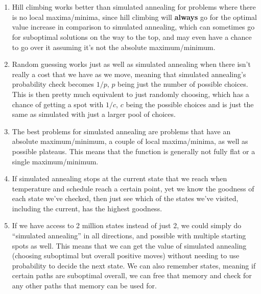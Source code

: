 \documentclass[12pt]{article}
\begin{document}
\section{}
\begin{enumerate}[label={\large\textbf{\alph*)}}]
\item Hill climbing works better than simulated annealing for problems where there is no local maxima/minima, since hill climbing will \textbf{always} go for the optimal value increase in comparison to simulated annealing, which can sometimes go for suboptimal solutions on the way to the top, and may even have a chance to go over it assuming it's not the absolute maximum/minimum.
\pagebreak
\item Random guessing works just as well as simulated annealing when there isn't really a cost that we have as we move, meaning that simulated annealing's probability check becomes $1/p$, $p$ being just the number of possible choices. This is then pretty much equivalent to just randomly choosing, which has a chance of getting a spot with $1/c$, $c$ being the possible choices and is just the same as simulated with just a larger pool of choices.
\item The best problems for simulated annealing are problems that have an absolute maximum/minimum, a couple of local maxima/minima, as well as possible plateaus. This means that the function is generally not fully flat or a single maximum/minimum.
\item If simulated annealing stops at the current state that we reach when temperature and schedule reach a certain point, yet we know the goodness of each state we've checked, then just see which of the states we've visited, including the current, has the highest goodness.
\item If we have access to 2 million states instead of just 2, we could simply do ``simulated annealing'' in all directions, and possible with multiple starting spots as well. This means that we can get the value of simulated annealing (choosing suboptimal but overall positive moves) without needing to use probability to decide the next state. We can also remember states, meaning if certain paths are suboptimal overall, we can free that memory and check for any other paths that memory can be used for.
\end{enumerate}
\end{document}
